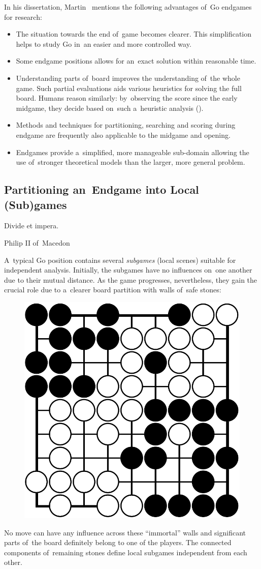 In his dissertation, Martin~\Mueller{} mentions the following advantages of~Go endgames for research:
\begin{itemize}
  \item The situation towards the end of~game becomes clearer.
    This simplification helps to study Go in~an easier and more controlled way.
  \item Some endgame positions allows for an~exact solution within reasonable time.
  \item Understanding parts of~board improves the understanding of~the whole game.
    Such partial evaluations aids various heuristics for solving the full board.
    Humans reason similarly: by~observing the score since the early midgame, they decide based on~such a~heuristic analysis (\cite{Takagawa85}).
  \item Methods and techniques for partitioning, searching and scoring during endgame are frequently also applicable to the midgame and opening.
  \item Endgames provide a~simplified, more manageable sub-domain allowing the use of~stronger theoretical models than the larger, more general problem.
\end{itemize}

\subsection{Partitioning an~Endgame into Local (Sub)games}
\epigraph{
  Divide et impera.
}{Philip II of~Macedon}

A~typical Go position contains several \emph{subgames} (local scenes) suitable for independent analysis.
Initially, the subgames have no influences on~one another due to their mutual distance.
As the game progresses, nevertheless, they gain the crucial role due to a~clearer board partition with walls of~safe stones:
\begin{figure}[H]
  \centering
  \includegraphics[width=.4\textwidth]{../img/late_endgame_Go_position_suited_for_exact_analysis.png}
  \label{fig:immortal-wall}
\end{figure}
No move can have any influence across these ``immortal'' walls and significant parts of~the board definitely belong to one of the players.
The connected components of~remaining stones define local subgames independent from each other.

